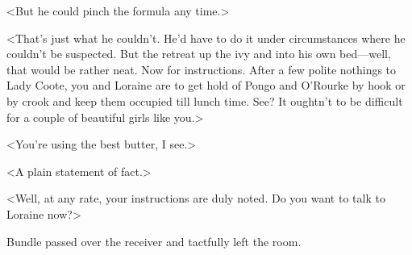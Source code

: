 <But he could pinch the formula any time.>

<That's just what he couldn't. He'd have to do it under circumstances where he couldn't be suspected. But the retreat up the ivy and into his own bed—well, that would be rather neat. Now for instructions. After a few polite nothings to Lady Coote, you and Loraine are to get hold of Pongo and O'Rourke by hook or by crook and keep them occupied till lunch time. See? It oughtn't to be difficult for a couple of beautiful girls like you.>

<You're using the best butter, I see.>

<A plain statement of fact.>

<Well, at any rate, your instructions are duly noted. Do you want to talk to Loraine now?>

Bundle passed over the receiver and tactfully left the room.